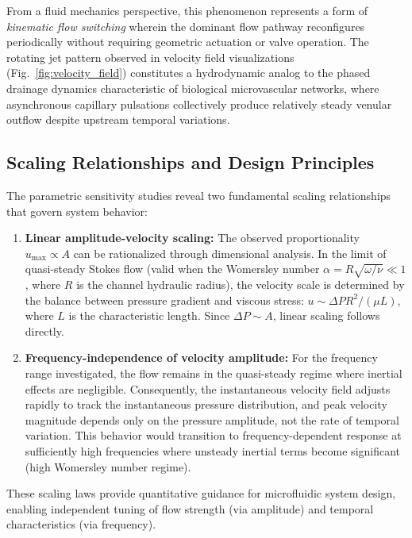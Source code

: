 \documentclass[12pt,a4paper]{article}
\begin{document}
From a fluid mechanics perspective, this phenomenon represents a form of \textit{kinematic flow switching} wherein the dominant flow pathway reconfigures periodically without requiring geometric actuation or valve operation. The rotating jet pattern observed in velocity field visualizations (Fig.~\ref{fig:velocity_field}) constitutes a hydrodynamic analog to the phased drainage dynamics characteristic of biological microvascular networks, where asynchronous capillary pulsations collectively produce relatively steady venular outflow despite upstream temporal variations.

\subsection{Scaling Relationships and Design Principles}

The parametric sensitivity studies reveal two fundamental scaling relationships that govern system behavior:

\begin{enumerate}
  \item \textbf{Linear amplitude-velocity scaling:} The observed proportionality $u_{\text{max}} \propto A$ can be rationalized through dimensional analysis. In the limit of quasi-steady Stokes flow (valid when the Womersley number $\alpha = R\sqrt{\omega/\nu} \ll 1$, where $R$ is the channel hydraulic radius), the velocity scale is determined by the balance between pressure gradient and viscous stress: $u \sim \Delta P R^2 / (\mu L)$, where $L$ is the characteristic length. Since $\Delta P \sim A$, linear scaling follows directly.
  
  \item \textbf{Frequency-independence of velocity amplitude:} For the frequency range investigated, the flow remains in the quasi-steady regime where inertial effects are negligible. Consequently, the instantaneous velocity field adjusts rapidly to track the instantaneous pressure distribution, and peak velocity magnitude depends only on the pressure amplitude, not the rate of temporal variation. This behavior would transition to frequency-dependent response at sufficiently high frequencies where unsteady inertial terms become significant (high Womersley number regime).
\end{enumerate}

These scaling laws provide quantitative guidance for microfluidic system design, enabling independent tuning of flow strength (via amplitude) and temporal characteristics (via frequency).
\end{document}
